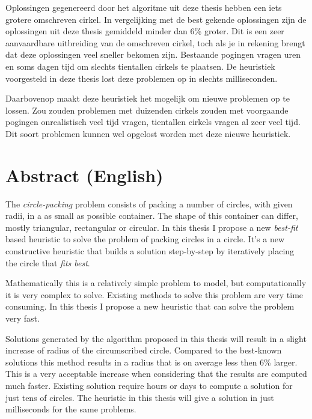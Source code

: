 \documentclass[12pt,a4paper,oneside]{book}
\begin{document}
Oplossingen gegenereerd door het algoritme uit deze thesis hebben een iets grotere omschreven cirkel.
In vergelijking met de best gekende oplossingen zijn de oplossingen uit deze thesis gemiddeld minder dan 6\% groter.
Dit is een zeer aanvaardbare uitbreiding van de omschreven cirkel, toch als je in rekening brengt dat deze oplossingen veel sneller bekomen zijn.
Bestaande pogingen vragen uren en soms dagen tijd om slechts tientallen cirkels te plaatsen.
De heuristiek voorgesteld in deze thesis lost deze problemen op in slechts milliseconden.

Daarbovenop maakt deze heuristiek het mogelijk om nieuwe problemen op te lossen.
Zou zouden problemen met duizenden cirkels zouden met voorgaande pogingen onrealistisch veel tijd vragen, tientallen cirkels vragen al zeer veel tijd.
Dit soort problemen kunnen wel opgelost worden met deze nieuwe heuristiek.

\newpage

\chapter*{Abstract (English)}

The \textit{circle-packing} problem consists of packing a number of circles, with given radii, in a as small as possible container.
The shape of this container can differ, mostly triangular, rectangular or circular.
In this thesis I propose a new \textit{best-fit} based heuristic to solve the problem of packing circles in a circle.
It's a new constructive heuristic that builds a solution step-by-step by iteratively placing the circle that \textit{fits best}.

Mathematically this is a relatively simple problem to model, but computationally it is very complex to solve.
Existing methods to solve this problem are very time consuming.
In this thesis I propose a new heuristic that can solve the problem very fast.

Solutions generated by the algorithm proposed in this thesis will result in a slight increase of radius of the circumscribed circle.
Compared to the best-known solutions this method results in a radius that is on average less then 6\% larger.
This is a very acceptable increase when considering that the results are computed much faster.
Existing solution require hours or days to compute a solution for just tens of circles.
The heuristic in this thesis will give a solution in just milliseconds for the same problems.
\end{document}
